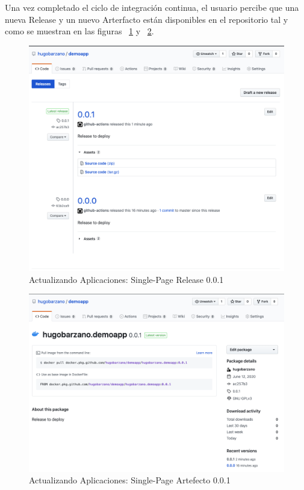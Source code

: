 \documentclass[a4paper,11pt]{book}
\begin{document}
 Una vez completado el ciclo de integración continua, el usuario percibe que una nueva Release y un nuevo Arterfacto están disponibles en el repositorio tal y como se muestran en las figuras ~\ref{2_8} y ~\ref{2_9}. 
 
   \begin{figure}[H]
\centering
\includegraphics[scale=0.27]{imagenes/casouso_a/2_8.png}
\caption{  Actualizando Aplicaciones: Single-Page Release 0.0.1}
\label{2_8}
\end{figure}

\begin{figure}[H]
\centering
\includegraphics[scale=0.27]{imagenes/casouso_a/2_9.png}
\caption{  Actualizando Aplicaciones: Single-Page Artefecto 0.0.1 }
\label{2_9}
\end{figure}
 
\end{document}
